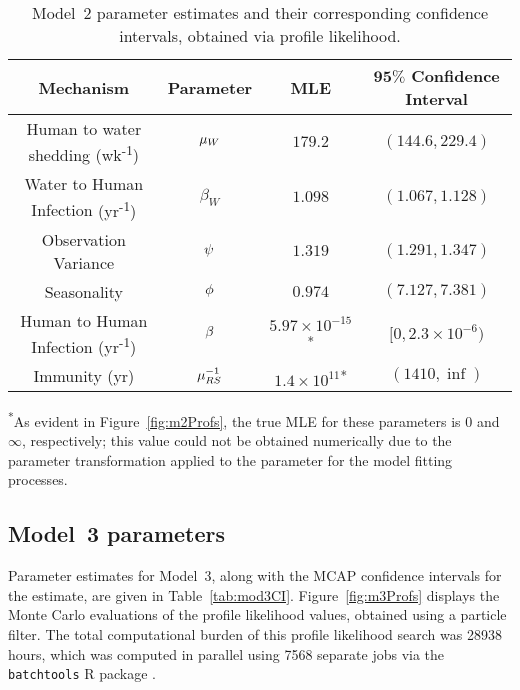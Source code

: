 \begin{table}[!h]
\centering
\caption[Model~2 parameter estimates and confidence intervals.]{\label{tab:mod2CI}Model~2 parameter estimates and their corresponding confidence intervals, obtained via profile likelihood.}
\vspace{2mm}
\begin{tabular}{|c|c|c|c|}
\hline
\textbf{Mechanism} & \textbf{Parameter} & \textbf{MLE} & $\bm{95\%}$ \textbf{Confidence Interval}
\\
\hline
\hline

 Human to water shedding {\small (wk\textsuperscript{-1})} & $\mu_W$ & $179.2$
   &
  $(144.6, 229.4)$
\\
\hline

 Water to Human Infection {\small (yr\textsuperscript{-1})} & $\beta_W$ & $1.098$
   &
  $(1.067, 1.128)$
\\
\hline

 Observation Variance & $\psi$ & $1.319$
   &
  $(1.291, 1.347)$
\\
\hline

 Seasonality & $\phi$ & $0.974$
   &
  $(7.127, 7.381)$
\\
\hline

Human to Human Infection {\small (yr\textsuperscript{-1})} & $\beta$ & $\ensuremath{5.97\times 10^{-15}}$\textsuperscript{*}
   &
  $[0, \ensuremath{2.3\times 10^{-6}})$
\\
\hline

Immunity {\small (yr)} & $\mu_{RS}^{-1}$ & $\ensuremath{1.4\times 10^{11}}$\textsuperscript{*}
   &
  $(1410, \inf)$
\\
\hline

\end{tabular}
\begin{flushleft}
\textsuperscript{*}As evident in Figure~\ref{fig:m2Profs}, the true MLE for these parameters is $0$ and $\infty$, respectively; this value could not be obtained numerically due to the parameter transformation applied to the parameter for the model fitting processes.
\end{flushleft}
\end{table}

\subsection{Model~3 parameters}

Parameter estimates for Model~3, along with the MCAP confidence intervals for the estimate, are given in Table~\ref{tab:mod3CI}.
Figure~\ref{fig:m3Profs} displays the Monte Carlo evaluations of the profile likelihood values, obtained using a particle filter.
The total computational burden of this profile likelihood search was 28938 hours, which was computed in parallel using 7568 separate jobs via the \texttt{batchtools} R package \cite{batchtools}.





